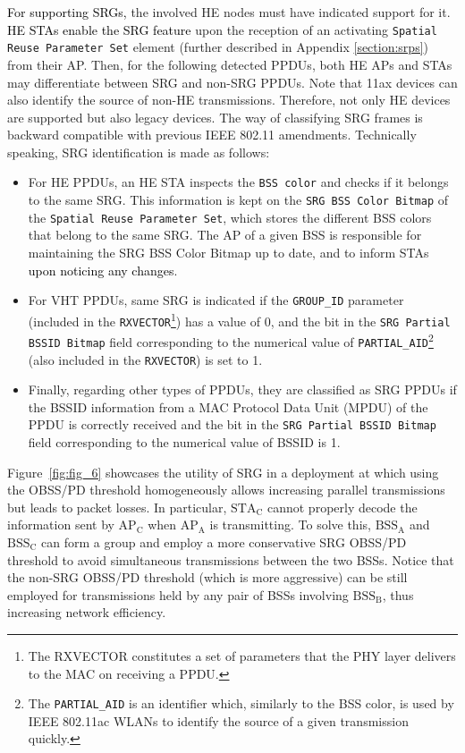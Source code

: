 \documentclass[preprint,12pt]{elsarticle}
\theoremstyle{plain}
\begin{document}
\textcolor{black}{For supporting SRGs,} the involved HE nodes must have indicated support for it. \textcolor{black}{HE STAs enable the SRG feature} upon the reception of an activating \texttt{Spatial Reuse Parameter Set} element (further described in Appendix \ref{section:srps}) from their AP. Then, for the following detected PPDUs, both HE APs and STAs may differentiate between SRG and non-SRG PPDUs. Note that 11ax devices can also identify the source of non-HE transmissions. Therefore, not only HE devices are supported but also legacy devices. The way of classifying SRG frames is backward compatible with previous IEEE 802.11 amendments. Technically speaking, SRG identification is made as follows:
\begin{itemize}
	\item For HE PPDUs, an HE STA inspects the \texttt{BSS color} and checks if it belongs to the same SRG. This information is kept on the \texttt{SRG BSS Color Bitmap} of the \texttt{Spatial Reuse Parameter Set}, which stores the different BSS colors that belong to the same SRG. The AP of a given BSS is responsible for maintaining the SRG BSS Color Bitmap up to date, and to inform STAs \textcolor{black}{upon noticing any changes}.
	\item For VHT PPDUs, same SRG is indicated if the \texttt{GROUP\_ID} parameter (included in the \texttt{RXVECTOR}\footnote{The RXVECTOR constitutes a set of parameters that the PHY layer delivers to the MAC on receiving a PPDU.}) has a value of 0, and the bit in the \texttt{SRG Partial BSSID Bitmap} field corresponding to the numerical value of \texttt{PARTIAL\_AID}\footnote{The \texttt{PARTIAL\_AID} is an identifier which, similarly to the BSS color, is used by IEEE 802.11ac WLANs to identify the source of a given transmission quickly.} (also included in the \texttt{RXVECTOR}) is set to 1. 
	\item Finally, regarding other types of PPDUs, they are classified as SRG PPDUs if the BSSID information from a MAC Protocol Data Unit (MPDU) of the PPDU is correctly received and the bit in the \texttt{SRG Partial BSSID Bitmap} field corresponding to the numerical value of BSSID is 1.
\end{itemize}

Figure~\ref{fig:fig_6} showcases the utility of SRG in a deployment at which using the OBSS/PD threshold homogeneously allows increasing parallel transmissions but leads to packet losses. In particular, $\text{STA}_\text{C}$ cannot properly decode the information sent by $\text{AP}_\text{C}$ when $\text{AP}_\text{A}$ is transmitting. To solve this, $\text{BSS}_\text{A}$ and $\text{BSS}_\text{C}$ can form a group and employ a more conservative SRG OBSS/PD threshold to avoid simultaneous transmissions between the two BSSs. Notice that the non-SRG OBSS/PD threshold (which is more aggressive) can be still employed for transmissions held by any pair of BSSs involving $\text{BSS}_\text{B}$, thus increasing network efficiency. %
\end{document}
